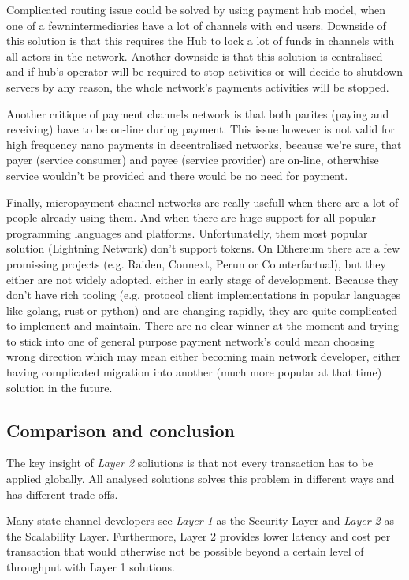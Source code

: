 \documentclass[a4paper,12pt]{article}
\begin{document}
Complicated routing issue could be solved by using payment hub model, when one 
of a fewnintermediaries have a lot of channels with end users. Downside of this 
solution is that this requires the Hub to lock a lot of funds in channels with 
all actors in the network. Another downside is that this solution is centralised 
and if hub's operator will be required to stop activities or will decide to 
shutdown servers by any reason, the whole network's payments activities will be 
stopped.

Another critique of payment channels network is that both parites (paying and 
receiving) have to be on-line during payment. This issue however is not valid for 
high frequency nano payments in decentralised networks, because we're sure, that
payer (service consumer) and payee (service provider) are on-line, otherwhise 
service wouldn't be provided and there would be no need for payment.

Finally, micropayment channel networks are really usefull when there are a lot
of people already using them. And when there are huge support for all popular 
programming languages and platforms. Unfortunatelly, them most popular solution
(Lightning Network) don't support tokens. On Ethereum there are a few promissing
projects (e.g. Raiden, Connext, Perun or Counterfactual), but they either are 
not widely adopted, either in early stage of development. Because they don't 
have rich tooling (e.g. protocol client implementations in popular languages 
like golang, rust or python) and are changing rapidly, they are quite 
complicated to implement and maintain. There are no clear winner at the moment
and trying to stick into one of general purpose payment network's could mean
choosing wrong direction which may mean either becoming main network developer,
either having complicated migration into another (much more popular at that 
time) solution in the future.

\subsection{Comparison and conclusion}

The key insight of \textit{Layer 2} soliutions is that not every transaction has
to be applied globally. All analysed solutions solves this problem in different 
ways and has different trade-offs. 

Many state channel developers see \textit{Layer 1} as the Security Layer and 
\textit{Layer 2} as the Scalability Layer. Furthermore, Layer 2 provides lower 
latency and cost per transaction that would otherwise not be possible beyond a 
certain level of throughput with Layer 1 solutions.
\end{document}

